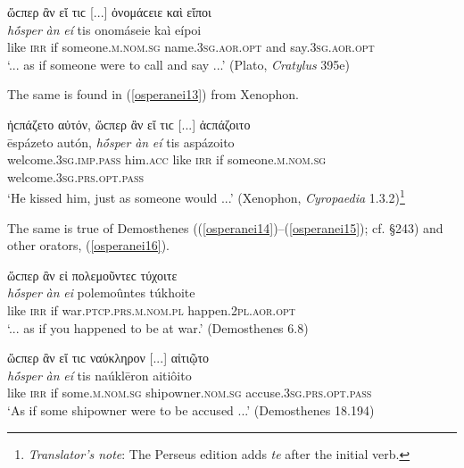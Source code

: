 \begin{exe}
\ex ὥϲπερ ἂν εἴ τιϲ {[}...{]} ὀνομάϲειε καὶ εἴποι\\
\gll \emph{hṓsper} \emph{àn} \emph{eí} tis onomáseie kaì eípoi\\
like \textsc{irr} if someone.\textsc{m.nom.sg} name.\textsc{3sg.aor.opt} and say.\textsc{3sg.aor.opt}\\
\trans `... as if someone were to call and say ...' (Plato, \textit{Cratylus} 395e)
\label{osperanei12}
\end{exe}

The same is found in (\ref{osperanei13}) from Xenophon.

\begin{exe}
\ex ἠϲπάζετο αὐτόν, ὥϲπερ ἂν εἴ τιϲ {[}...{]} ἀϲπάζοιτο\\
\gll ēspázeto autón, \emph{hṓsper} \emph{àn} \emph{eí} tis aspázoito\\
welcome.\textsc{3sg.imp.pass} him.\textsc{acc} like \textsc{irr} if someone.\textsc{m.nom.sg} welcome.\textsc{3sg.prs.opt.pass}\\
\trans `He kissed him, just as someone would ...' (Xenophon, \textit{Cyropaedia} 1.3.2)\footnote{\emph{Translator's note}: The Perseus edition adds \textit{te} after the initial verb.}
\label{osperanei13}
\end{exe}

The same is true of Demosthenes ((\ref{osperanei14})--(\ref{osperanei15}); cf. §243) and other orators, (\ref{osperanei16}).

\begin{exe}
\ex ὥϲπερ ἂν εἰ πολεμοῦντεϲ τύχοιτε\\
\gll \emph{hṓsper} \emph{àn} \emph{ei} polemoûntes túkhoite\\
like \textsc{irr} if war.\textsc{ptcp.prs.m.nom.pl} happen.\textsc{2pl.aor.opt}\\
\trans `... as if you happened to be at war.' (Demosthenes 6.8)
\label{osperanei14}
\end{exe}

\begin{exe}
\ex ὥϲπερ ἂν εἴ τιϲ ναύκληρον {[}...{]} αἰτιῷτο\\
\gll \emph{hṓsper} \emph{àn} \emph{eí} tis naúklēron aitiôito\\
like \textsc{irr} if some.\textsc{m.nom.sg} shipowner.\textsc{nom.sg} accuse.\textsc{3sg.prs.opt.pass}\\
\trans `As if some shipowner were to be accused ...' (Demosthenes 18.194)
\label{osperanei15}
\end{exe}

